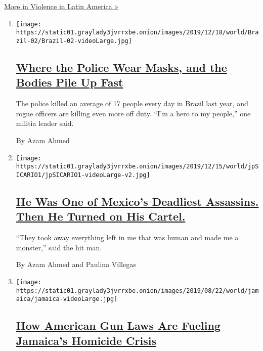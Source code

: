 \href{/spotlight/violence-in-latin-america}{More in Violence in Latin
America »}

\begin{enumerate}
\def\labelenumi{\arabic{enumi}.}
\item
  \texttt{[image: https://static01.graylady3jvrrxbe.onion/images/2019/12/18/world/Brazil-02/Brazil-02-videoLarge.jpg]}

  \hypertarget{where-the-police-wear-masks-and-the-bodies-pile-up-fast}{%
  \subsection{\texorpdfstring{\href{/2019/12/20/world/americas/brazil-police-shootings-murder.html}{Where
  the Police Wear Masks, and the Bodies Pile Up
  Fast}}{Where the Police Wear Masks, and the Bodies Pile Up Fast}}\label{where-the-police-wear-masks-and-the-bodies-pile-up-fast}}

  The police killed an average of 17 people every day in Brazil last
  year, and rogue officers are killing even more off duty. ``I'm a hero
  to my people,'' one militia leader said.

  By Azam Ahmed
\item
  \texttt{[image: https://static01.graylady3jvrrxbe.onion/images/2019/12/15/world/jpSICARIO1/jpSICARIO1-videoLarge-v2.jpg]}

  \hypertarget{he-was-one-of-mexicos-deadliest-assassins-then-he-turned-on-his-cartel}{%
  \subsection{\texorpdfstring{\href{/2019/12/14/world/americas/sicario-mexico-drug-cartels.html}{He
  Was One of Mexico's Deadliest Assassins. Then He Turned on His
  Cartel.}}{He Was One of Mexico's Deadliest Assassins. Then He Turned on His Cartel.}}\label{he-was-one-of-mexicos-deadliest-assassins-then-he-turned-on-his-cartel}}

  ``They took away everything left in me that was human and made me a
  monster,'' said the hit man.

  By Azam Ahmed and Paulina Villegas
\item
  \texttt{[image: https://static01.graylady3jvrrxbe.onion/images/2019/08/22/world/jamaica/jamaica-videoLarge.jpg]}

  \hypertarget{how-american-gun-laws-are-fueling-jamaicas-homicide-crisis}{%
  \subsection{\texorpdfstring{\href{/2019/08/25/world/americas/one-handgun-9-murders-how-american-firearms-cause-carnage-abroad.html}{How
  American Gun Laws Are Fueling Jamaica's Homicide
  Crisis}}{How American Gun Laws Are Fueling Jamaica's Homicide Crisis}}\label{how-american-gun-laws-are-fueling-jamaicas-homicide-crisis}}


\end{enumerate}
